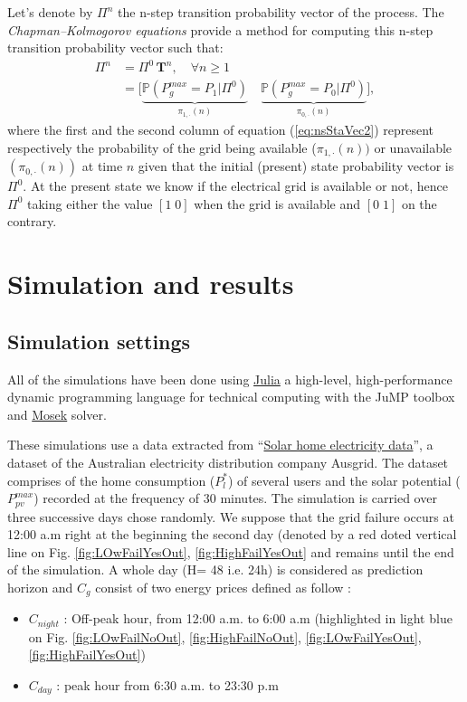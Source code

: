 \documentclass[conference]{IEEEtran}
\begin{document}
Let's denote by $\Pi^n$ the n-step transition probability vector of the process. The \textit{Chapman–Kolmogorov equations} provide a method for computing this n-step  transition probability vector such that: 
\begin{subequations}
    \begin{align}
    \Pi^n & = \Pi^0 \, \mathbf{T}^n, \quad \forall n \geq 1 \label{eq:nsStaVec1} \\
          & = \bigl[ \underbrace{\mathbb{P} (P_g^{max} = P_1 | \Pi^0)}_{\pi_{1,\cdot}(n)}\quad \underbrace{\mathbb{P} (P_g^{max} = P_0 | \Pi^0)}_{\pi_{0,\cdot}(n)} \bigl] \label{eq:nsStaVec2},
\end{align}
\end{subequations}
where the first and the second column of equation (\ref{eq:nsStaVec2}) represent respectively the probability of the grid being available ($\pi_{1,\cdot}(n))$ or unavailable $(\pi_{0,\cdot}(n))$ at time $n$ given that the initial (present) state probability vector  is $\Pi^0$. At the present state we know if the electrical grid is available or not, hence $\Pi^0$ taking either the value $[1\;0]$ when the grid is available and $[0\;1]$ on the contrary.


 \section{Simulation and results}
 
 \subsection{Simulation settings}
 All of the simulations have been done using \href{http://www.juliaopt.org/}{Julia} a high-level, high-performance dynamic programming language for technical computing with the JuMP toolbox and \href{https://www.mosek.com/}{Mosek} solver. 
 
 These simulations use a data extracted from ``\href{https://www.ausgrid.com.au/Common/About-us/Corporate-information/Data-to-share/Solar-home-electricity-data.aspx}{Solar home electricity data}'', a dataset of the Australian electricity distribution company Ausgrid. The dataset comprises of the home consumption ($P_l^*$) of several users and the solar potential ($P^{max}_{pv}$) recorded at the frequency of 30 minutes. The simulation is carried over three successive days chose randomly. We suppose that the grid failure occurs at 12:00 a.m right at the beginning the second day (denoted by a red doted vertical line on Fig. \ref{fig:LOwFailYesOut}, \ref{fig:HighFailYesOut} and remains until the end of the simulation. A whole day (H= 48 i.e. 24h) is considered as prediction horizon and $C_{g}$ consist of two energy prices defined as follow : 
\begin{itemize}
 \item $C_{night}$ : Off-peak hour, from 12:00 a.m. to 6:00 a.m (highlighted in light blue on Fig. \ref{fig:LOwFailNoOut}, \ref{fig:HighFailNoOut}, \ref{fig:LOwFailYesOut}, \ref{fig:HighFailYesOut})
 \item $C_{day}$ : peak hour from 6:30 a.m. to 23:30 p.m
\end{itemize}
\end{document}
